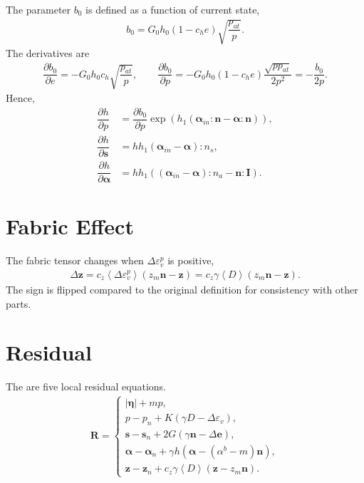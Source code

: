 \documentclass[11pt,a4paper]{article}
\newcommand*{\pfrac}[2]{\dfrac{\partial#1}{\partial#2}}
\begin{document}
The parameter $b_0$ is defined as a function of current state,
\begin{gather}
b_0=G_0h_0\left(1-c_he\right)\sqrt{\dfrac{p_{at}}{p}}.
\end{gather}
The derivatives are
\begin{gather}
\pfrac{b_0}{e}=-G_0h_0c_h\sqrt{\dfrac{p_{at}}{p}},\qquad
\pfrac{b_0}{p}=-G_0h_0\left(1-c_he\right)\dfrac{\sqrt{pp_{at}}}{2p^2}=-\dfrac{b_0}{2p}.
\end{gather}
Hence,
\begin{align}
\pfrac{h}{p}&=\pfrac{b_0}{p}\exp\left(h_1\left(\mathbold{\alpha}_{in}:\mathbold{n}-\mathbold{\alpha}:\mathbold{n}\right)\right),\\
\pfrac{h}{\mathbold{s}}&=hh_1\left(\mathbold{\alpha}_{in}-\mathbold{\alpha}\right):n_s,\\
\pfrac{h}{\mathbold{\alpha}}&=hh_1\left(\left(\mathbold{\alpha}_{in}-\mathbold{\alpha}\right):n_a-\mathbold{n}:\mathbf{I}\right).
\end{align}
\section{Fabric Effect}
The fabric tensor changes when $\Delta\varepsilon^p_v$ is positive,
\begin{gather}
\Delta\mathbold{z}=c_z\left\langle\Delta\varepsilon^p_v\right\rangle\left(z_m\mathbold{n}-\mathbold{z}\right)=c_z\gamma\left\langle{}D\right\rangle\left(z_m\mathbold{n}-\mathbold{z}\right).
\end{gather}
The sign is flipped compared to the original definition for consistency with other parts.
\section{Residual}
The are five local residual equations.
\begin{gather}
\mathbold{R}=\left\{\begin{array}{ll}
\big|\mathbold{\eta}\big|+mp,\\[2mm]
p-p_n+K\left(\gamma{}D-\Delta\varepsilon_v\right),\\[2mm]
\mathbold{s}-\mathbold{s}_n+2G\left(\gamma\mathbold{n}-\Delta\mathbold{e}\right),\\[2mm]
\mathbold{\alpha}-\mathbold{\alpha}_n+\gamma{}h\left(\mathbold{\alpha}-\left(\alpha^b-m\right)\mathbold{n}\right),\\[2mm]
\mathbold{z}-\mathbold{z}_n+c_z\gamma{}\left\langle{}D\right\rangle\left(\mathbold{z}-z_m\mathbold{n}\right).
\end{array}
\right.
\end{gather}
\end{document}
